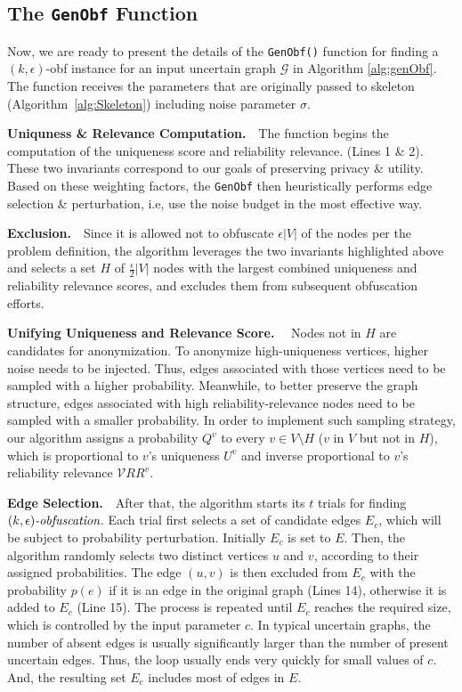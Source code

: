 \subsection{The \texttt{GenObf} Function}

Now, we are ready to present the details of the  \texttt{GenObf()} function for finding 
a $(k,\epsilon)$-obf instance for an input uncertain graph $\mathcal{G}$ in Algorithm \ref{alg:genObf}. The function receives the parameters that are originally passed to \SysName skeleton (Algorithm~\ref{alg:Skeleton}) including noise parameter $\sigma$.  



\textbf{Uniquness \& Relevance Computation.}~~The function begins the computation of the uniqueness score and reliability relevance. (Lines 1 \& 2).
These two invariants correspond to our goals of preserving privacy \& utility.   
Based on these weighting factors, the \texttt{GenObf} then heuristically performs edge selection \& perturbation, i.e, use the noise budget in the most effective way. 


\textbf{Exclusion.}~~Since it is allowed not to obfuscate $\epsilon|V|$ of the nodes per the problem definition, the algorithm leverages the two invariants highlighted above and selects a set $H$ of $\frac{\epsilon}{2}|V|$ nodes with the largest combined uniqueness and reliability relevance scores, and excludes them from subsequent obfuscation efforts. 


\textbf{Unifying Uniqueness and Relevance Score.}~~
Nodes not in $H$ are candidates for anonymization. 
To anonymize high-uniqueness vertices, higher noise needs to be injected. Thus, edges associated with those vertices need to be sampled with a higher probability. Meanwhile, to better preserve the graph structure, edges associated with high reliability-relevance nodes need to be sampled with a smaller probability.
In order to implement such sampling strategy, our algorithm assigns a probability $Q^{v}$ to every $v \in V \setminus H$ ($v$ in $V$ but not in $H$), 
which is proportional to $v$'s uniqueness $U^{v}$ and inverse proportional to $v$'s reliability relevance $\mathcal{V}RR^{v}$. 

 

\textbf{Edge Selection.}~~After that, the algorithm starts its $t$ trials for finding $\textit{$(k,\epsilon)$-obfuscation}$. Each trial first selects a set of candidate edges $E_{c}$, which will be subject to probability perturbation.
Initially $E_{c}$ is set to $E$. Then, the algorithm randomly selects two distinct vertices $u$ and $v$, according to their assigned probabilities. 
The edge $(u,v)$ is then excluded from $E_{c}$ with the probability $p(e)$ if it is an edge in the original graph (Lines 14), 
otherwise it is added to $E_{c}$ (Line 15).  
The process is repeated until $E_{c}$ reaches the required size, which is controlled by the input parameter $c$.
In typical uncertain graphs, the number of absent edges is usually significantly larger than the number of present uncertain edges. 
Thus, the loop usually ends very quickly for small values of $c$. And, the resulting set $E_{c}$ includes most of edges in $E$. 


